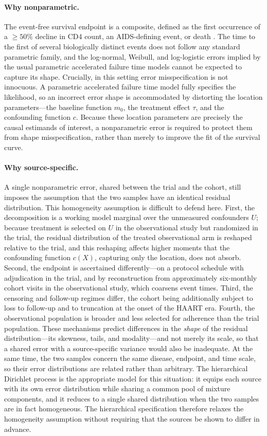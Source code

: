 \documentclass[11pt]{article}
\theoremstyle{plain}
\theoremstyle{definition}
\theoremstyle{remark}
\newcommand{\1}{\mathds{1}}
\begin{document}
\paragraph{Why nonparametric.} The event-free survival endpoint is a composite,
defined as the first occurrence of a $\geq 50\%$ decline in CD4 count, an
AIDS-defining event, or death \citep{hammer1996}. The time to the first of
several biologically distinct events does not follow any standard parametric
family, and the log-normal, Weibull, and log-logistic errors implied by the
usual parametric accelerated failure time models cannot be expected to capture
its shape. Crucially, in this setting error misspecification is not innocuous. A
parametric accelerated failure time model fully specifies the likelihood, so an
incorrect error shape is accommodated by distorting the location parameters---the
baseline function $m_0$, the treatment effect $\tau$, and the confounding
function $c$. Because these location parameters are precisely the causal
estimands of interest, a nonparametric error is required to protect them from
shape misspecification, rather than merely to improve the fit of the survival
curve.

\paragraph{Why source-specific.} A single nonparametric error, shared between the
trial and the cohort, still imposes the assumption that the two samples have an
identical residual distribution. This homogeneity assumption is difficult to
defend here. First, the decomposition is a working model marginal over the
unmeasured confounders $U$; because treatment is selected on $U$ in the
observational study but randomized in the trial, the residual distribution of
the treated observational arm is reshaped relative to the trial, and this
reshaping affects higher moments that the confounding function $c(X)$, capturing
only the location, does not absorb. Second, the endpoint is ascertained
differently---on a protocol schedule with adjudication in the trial, and by
reconstruction from approximately six-monthly cohort visits in the observational
study, which coarsens event times. Third, the censoring and follow-up regimes
differ, the cohort being additionally subject to loss to follow-up and to
truncation at the onset of the HAART era. Fourth, the observational population
is broader and less selected for adherence than the trial population. These
mechanisms predict differences in the \emph{shape} of the residual
distribution---its skewness, tails, and modality---and not merely its scale, so
that a shared error with a source-specific variance would also be inadequate. At
the same time, the two samples concern the same disease, endpoint, and time
scale, so their error distributions are related rather than arbitrary. The
hierarchical Dirichlet process is the appropriate model for this situation: it
equips each source with its own error distribution while sharing a common pool
of mixture components, and it reduces to a single shared distribution when the
two samples are in fact homogeneous. The hierarchical specification therefore
relaxes the homogeneity assumption without requiring that the sources be shown
to differ in advance.
\end{document}
